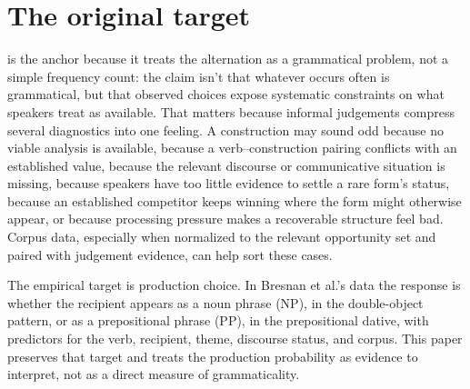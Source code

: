 \section{The original target}

\textcite{bresnan2007} is the anchor because it treats the alternation as a
grammatical problem, not a simple frequency count: the claim isn't that
whatever occurs often is grammatical, but that observed choices expose
systematic constraints on what speakers treat as available. That matters because
informal judgements compress several diagnostics into one feeling. A
construction may sound odd because no viable analysis is available, because a
verb--construction pairing conflicts with an established value, because the
relevant discourse or communicative situation is missing, because speakers have
too little evidence to settle a rare form's status, because an established
competitor keeps winning where the form might otherwise appear, or because
processing pressure makes a recoverable structure feel bad. Corpus data,
especially when normalized to the relevant opportunity set and paired with
judgement evidence, can help sort these cases.

The empirical target is production choice. In Bresnan et al.'s data the response
is whether the recipient appears as a noun phrase (NP), in the double-object
pattern, or as a prepositional phrase (PP), in the prepositional dative, with
predictors for the verb, recipient, theme, discourse status, and corpus. This
paper preserves that target and treats the production probability as evidence to
interpret, not as a direct measure of grammaticality.
